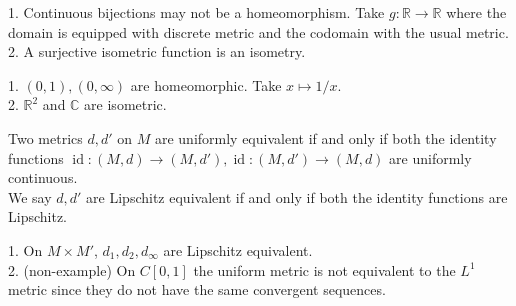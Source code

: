 \begin{remark}
    1. Continuous bijections may not be a homeomorphism.
    Take $g:\mathbb R\to\mathbb R$ where the domain is equipped with discrete metric and the codomain with the usual metric.\\
    2. A surjective isometric function is an isometry.
\end{remark}
\begin{example}
    1. $(0,1),(0,\infty)$ are homeomorphic.
    Take $x\mapsto 1/x$.\\
    2. $\mathbb R^2$ and $\mathbb C$ are isometric. 
\end{example}
\begin{definition}
    Two metrics $d,d'$ on $M$ are uniformly equivalent if and only if both the identity functions $\operatorname{id}:(M,d)\to(M,d'),\operatorname{id}:(M,d')\to(M,d)$ are uniformly continuous.\\
    We say $d,d'$ are Lipschitz equivalent if and only if both the identity functions are Lipschitz.
\end{definition}
\begin{example}
    1. On $M\times M'$, $d_1,d_2,d_\infty$ are Lipschitz equivalent.\\
    2. (non-example) On $C[0,1]$ the uniform metric is not equivalent to the $L^1$ metric since they do not have the same convergent sequences.
\end{example}

